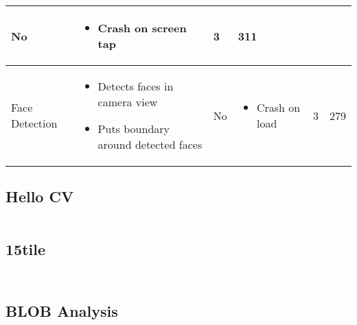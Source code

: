 \begin{landscape}
\begin{table}[h!]
\begin{tabular}{|l|p{}|l|p{}|r|r|}
				No&
				\begin{itemize}[noitemsep,topsep=0pt,parsep=0pt]
					\item{Crash on screen tap}
				\end{itemize}&
				3&
				311\\
				\hline
				Face Detection&
				\begin{itemize}[noitemsep,topsep=0pt,parsep=0pt]
					\item{Detects faces in camera view}
					\item{Puts boundary around detected faces}
				\end{itemize}&
				No&
				\begin{itemize}[noitemsep,topsep=0pt,parsep=0pt]
					\item{Crash on load}
				\end{itemize}&
				3&
				279\\
				\hline
			\end{tabular}
		\end{table}
	\end{landscape}
\restoregeometry
\subsection{Hello CV}
	\inputminted[breaklines,
					linenos,
					frame=lines,
					fontsize=\footnotesize]{java}{../code/android/hello_cv/MainActivity.java}
	\subsection{15tile}
	\inputminted[breaklines,
					linenos,
					frame=lines,
					fontsize=\footnotesize]{java}{../code/android/15tile/MainActivity.java}
	\inputminted[breaklines,
					linenos,
					frame=lines,
					fontsize=\footnotesize]{java}{../code/android/15tile/PuzzleProcessor.java}
	\subsection{BLOB Analysis}
	\inputminted[breaklines,
					linenos,
					frame=lines,
					fontsize=\footnotesize]{java}{../code/android/blob_analysis/ColorBlobDetectionActivity.java}
	\inputminted[breaklines,
					linenos,
					frame=lines,
					fontsize=\footnotesize]{java}{../code/android/blob_analysis/ColorBlobDetector.java}
